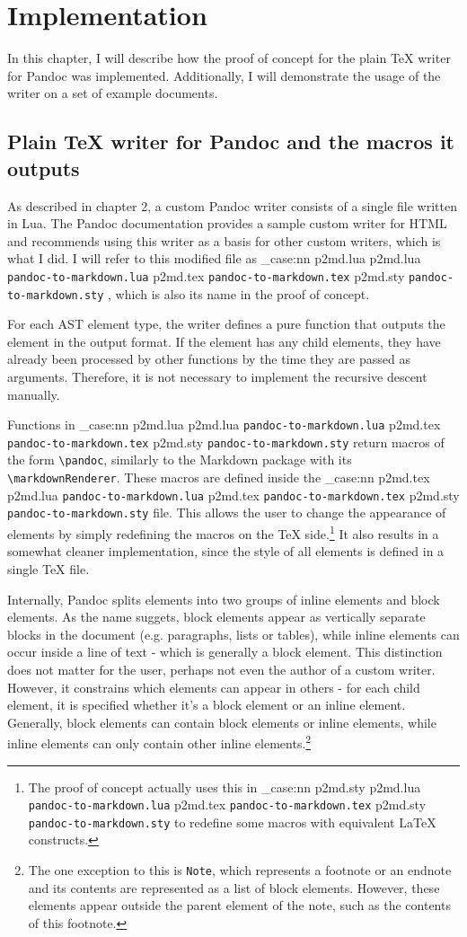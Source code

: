 \documentclass[
  digital,     %
  oneside,     %
  nosansbold,  %
  nocolorbold, %
  lof,         %
  lot,         %
]{fithesis4}
\newcommand\macro[1]{\texttt{\textbackslash{}{#1}}}
\newcommand\pandoc[1]{\macro{pandoc\-{#1}}}
\newcommand\renderer[1]{\macro{markdown\-Renderer\-{#1}}}
\newcommand\file[1]
  {
    \str_case:nn
      { #1 }
      {
        { p2md.lua } { \texttt{pandoc\hyp{}to\hyp{}markdown.lua} }
        { p2md.tex } { \texttt{pandoc\hyp{}to\hyp{}markdown.tex} }
        { p2md.sty } { \texttt{pandoc\hyp{}to\hyp{}markdown.sty} }
      }
  }
\begin{document}
\chapter{Implementation}
In this chapter, I will describe how the proof of concept for the plain \TeX{} writer for Pandoc was implemented. Additionally, I will demonstrate the usage of the writer on a set of example documents.

\section{Plain \TeX{} writer for Pandoc and the macros it outputs}
As described in chapter 2, a custom Pandoc writer consists of a single file written in Lua. The Pandoc documentation provides a sample custom writer for HTML and recommends using this writer as a basis for other custom writers, which is what I did. I will refer to this modified file as \file{p2md.lua}, which is also its name in the proof of concept.

For each AST element type, the writer defines a pure function that outputs the element in the output format. If the element has any child elements, they have already been processed by other functions by the time they are passed as arguments. Therefore, it is not necessary to implement the recursive descent manually.

Functions in \file{p2md.lua} return macros of the form \pandoc{ElementName}, similarly to the Markdown package with its \renderer{ElementName}. These macros are defined inside the \file{p2md.tex} file. This allows the user to change the appearance of elements by simply redefining the macros on the \TeX{} side.\footnote{The proof of concept actually uses this in \file{p2md.sty} to redefine some macros with equivalent \LaTeX{} constructs.} It also results in a somewhat cleaner implementation, since the style of all elements is defined in a single \TeX{} file. 

Internally, Pandoc splits elements into two groups of inline elements and block elements. As the name suggets, block elements appear as vertically separate blocks in the document (e.g. paragraphs, lists or tables), while inline elements can occur inside a line of text - which is generally a block element. This distinction does not matter for the user, perhaps not even the author of a custom writer. However, it constrains which elements can appear in others - for each child element, it is specified whether it's a block element or an inline element. Generally, block elements can contain block elements or inline elements, while inline elements can only contain other inline elements.\footnote{The one exception to this is \texttt{Note}, which represents a footnote or an endnote and its contents are represented as a list of block elements. However, these elements appear outside the parent element of the note, such as the contents of this footnote.}
\end{document}
